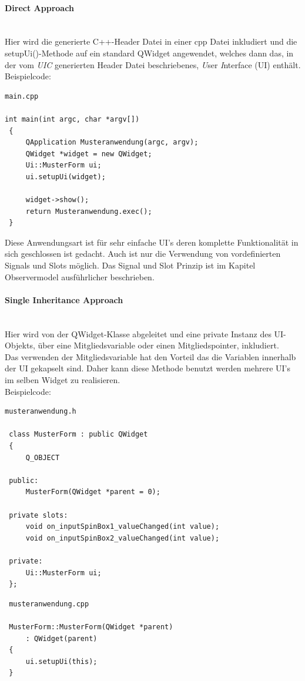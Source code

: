 \paragraph{Direct Approach}\mbox{}\\
Hier wird die generierte C++-Header Datei in einer cpp Datei inkludiert und die setupUi()-Methode auf ein standard QWidget angewendet, welches dann das, in der vom \textit{UIC} generierten Header Datei beschriebenes, \textit{U}ser \textit{I}nterface (UI) enthält.\\Beispielcode:
\begin{lstlisting}
main.cpp

int main(int argc, char *argv[])
 {
     QApplication Musteranwendung(argc, argv);
     QWidget *widget = new QWidget;
     Ui::MusterForm ui;
     ui.setupUi(widget);

     widget->show();
     return Musteranwendung.exec();
 }
\end{lstlisting}
Diese Anwendungsart ist für sehr einfache UI’s deren komplette Funktionalität in sich geschlossen ist gedacht. Auch ist nur die Verwendung von vordefinierten Signals und Slots möglich. Das Signal und Slot Prinzip ist im Kapitel Observermodel ausführlicher beschrieben.
\newpage
\paragraph{Single Inheritance Approach}\mbox{}\\
Hier wird von der QWidget-Klasse abgeleitet und eine private Instanz des UI-Objekts, über eine Mitgliedsvariable oder einen Mitgliedspointer, inkludiert.\\
Das verwenden der Mitgliedsvariable hat den Vorteil das die Variablen innerhalb der UI gekapselt sind. Daher kann diese Methode benutzt werden mehrere UI’s im selben Widget zu realisieren.\\Beispielcode:
\begin{lstlisting}
musteranwendung.h

 class MusterForm : public QWidget
 {
     Q_OBJECT

 public:
     MusterForm(QWidget *parent = 0);

 private slots:
     void on_inputSpinBox1_valueChanged(int value);
     void on_inputSpinBox2_valueChanged(int value);

 private:
     Ui::MusterForm ui;
 };
\end{lstlisting}
\begin{lstlisting}
 musteranwendung.cpp

 MusterForm::MusterForm(QWidget *parent)
     : QWidget(parent)
 {
     ui.setupUi(this);
 }
\end{lstlisting}

